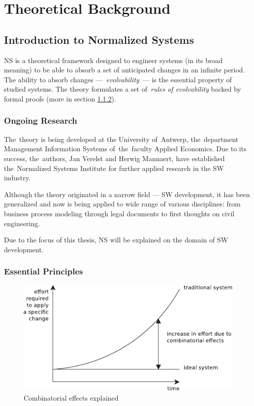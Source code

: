 \documentclass[thesis=M,english,hidelinks]{FITthesis}[2012/10/20]
\begin{document}
% 
% 
\chapter{Theoretical Background}
\label{sec:theoretical_background}

% 
% 
\section{Introduction to Normalized Systems}
\acrfull{NS} is a theoretical framework designed to engineer systems (in its broad meaning) to be able to absorb a set of anticipated changes in an infinite period. The ability to absorb changes ---~\textit{evolvability}~--- is the essential property of studied systems. The theory formulates a set of~\textit{rules of evolvability} backed by formal proofs (more in section \ref{sec:evolvability_rules}).

\subsection{Ongoing Research}
The~theory is being developed at the University of~Antwerp, the~department Management Information Systems of~the~faculty Applied Economics. Due to its success, the~authors, Jan Verelst and Herwig Mannaert, have established the~Normalized Systems Institute for further applied research in the \acrshort{SW} industry.

Although the theory originated in a narrow field --- \acrlong{SW} development, it has been generalized and now is being applied to wide range of various disciplines: from business process modeling through legal documents to first thoughts on civil engineering.~\cite{ns-towards-evolvable}

Due to the focus of this thesis, \acrlong{NS} will be explained on the domain of \acrlong{SW} development.

\subsection{Essential Principles}
\label{sec:evolvability_rules}

\begin{figure}[t]
  \centering
    \includegraphics{images/Combinatorial_effects_explained.pdf}
   	\caption{Combinatorial effects explained}
    \label{fig:combinatorial_effects}
\end{figure}
\end{document}
